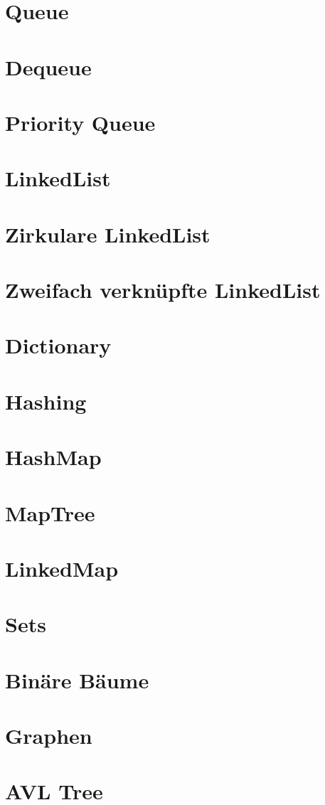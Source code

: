 \documentclass{book}
\begin{document}
\section{Queue}
\section{Dequeue}
\section{Priority Queue}
\section{LinkedList}
\section{Zirkulare LinkedList}
\section{Zweifach verknüpfte LinkedList}
\section{Dictionary}
\section{Hashing}
\section{HashMap}
\section{MapTree}
\section{LinkedMap}
\section{Sets}
\section{Binäre Bäume}
\section{Graphen}
\section{AVL Tree}
\end{document}
